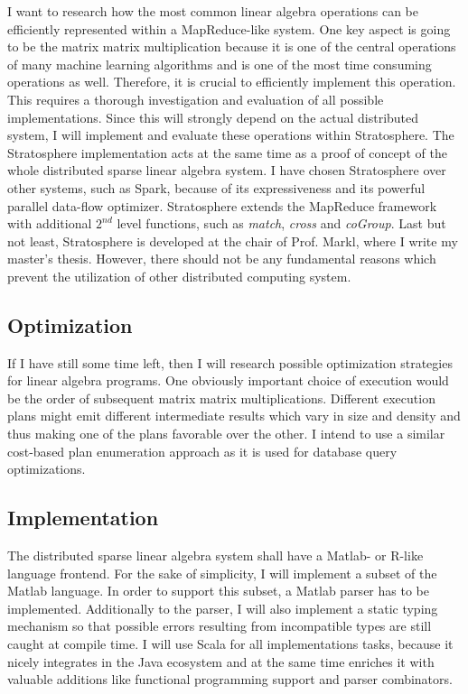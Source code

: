 \documentclass{dima}
\begin{document}
I want to research how the most common linear algebra operations can be efficiently represented within a MapReduce-like system.
One key aspect is going to be the matrix matrix multiplication because it is one of the central operations of many machine learning algorithms and is one of the most time consuming operations as well.
Therefore, it is crucial to efficiently implement this operation.
This requires a thorough investigation and evaluation of all possible implementations.
Since this will strongly depend on the actual distributed system, I will implement and evaluate these operations within Stratosphere.
The Stratosphere implementation acts at the same time as a proof of concept of the whole distributed sparse linear algebra system.
I have chosen Stratosphere over other systems, such as Spark, because of its expressiveness and its powerful parallel data-flow optimizer.
Stratosphere extends the MapReduce framework with additional $2^{nd}$ level functions, such as \emph{match}, \emph{cross} and \emph{coGroup}.
Last but not least, Stratosphere is developed at the chair of Prof. Markl, where I write my master's thesis.
However, there should not be any fundamental reasons which prevent the utilization of other distributed computing system.

\subsection{Optimization}

If I have still some time left, then I will research possible optimization strategies for linear algebra programs.
One obviously important choice of execution would be the order of subsequent matrix matrix multiplications.
Different execution plans might emit different intermediate results which vary in size and density and thus making one of the plans favorable over the other.
I intend to use a similar cost-based plan enumeration approach as it is used for database query optimizations.

\subsection{Implementation}

The distributed sparse linear algebra system shall have a Matlab- or R-like language frontend.
For the sake of simplicity, I will implement a subset of the Matlab language.
In order to support this subset, a Matlab parser has to be implemented.
Additionally to the parser, I will also implement a static typing mechanism so that possible errors resulting from incompatible types are still caught at compile time.
I will use Scala for all implementations tasks, because it nicely integrates in the Java ecosystem and at the same time enriches it with valuable additions like functional programming support and parser combinators.
\end{document}
